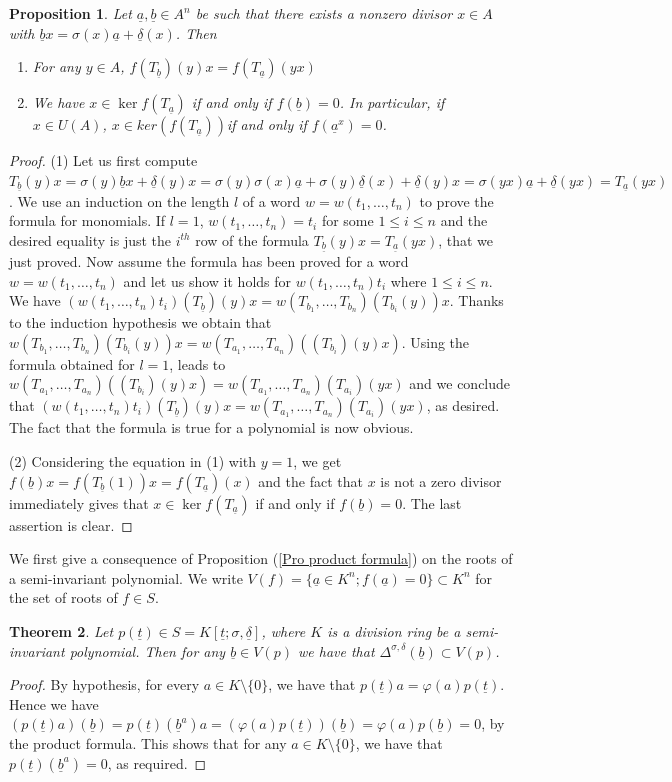 \documentclass[12pt,a4paper]{article}
\newtheorem{theorem}{Theorem}[section]
\newtheorem{proposition}[theorem]{Proposition}
\newcommand{\ut}{\underline{t}}
\newcommand{\ua}{\underline{a}}
\newcommand{\ub}{\underline{b}}
\newcommand{\ud}{\underline{\delta}}
\begin{document}
	\begin{proposition}
		\label{Pro Roots and conjugation}
		Let 
		$\ua,\ub\in A^n$  be such that there exists a nonzero divisor $x\in A$ with $\ub x= \sigma(x)\ua + \ud(x)$.  Then
		\begin{enumerate}
			\item For any $y\in A$, $f(T_{\ub})(y)x=f(T_{\ua})(yx)$
			\item We have 
			$x\in \ker f(T_{\ua}) $ if and only if $f(\ub)=0$.  In particular, if $x\in U(A)$, $x\in ker(f(T_{\ua}))$if and only if $f(\ua^x)=0$.
		\end{enumerate}
	\end{proposition}
	\begin{proof}
		(1)  Let us first compute 
		$T_{\ub}(y)x=\sigma(y)\ub x + 
		\ud(y)x=\sigma(y)\sigma(x)\ua 
		+\sigma(y)\ud(x)+\ud(y)x=\sigma(yx)\ua + \ud(yx)=T_{\ua}(yx)$.
		We use an induction on the length $l$ of a word $w=w(t_1,\dots , t_n)$ to prove the formula for monomials.  If $l=1$, $w(t_1,\dots,t_n)=t_i$ for some $1\le i \le n$ and the desired equality is just the $i^{th}$ row of the formula $T_{\ub}(y)x=T_{\ua}(yx)$, that we just proved.  Now assume the formula has been proved for a word $w=w(t_1,\dots,t_n)$ and let us show it holds for $w(t_1,\dots,t_n)t_i$ where $1\le i \le n$.  We have $(w(t_1,\dots,t_n)t_i)(T_{\ub})(y)x=
		w(T_{b_1},\dots ,T_{b_n})(T_{b_i}(y))x$.   Thanks to the induction hypothesis we obtain that 
		$w(T_{b_1},\dots ,T_{b_n})(T_{b_i}(y))x=w(T_{a_1},\dots,T_{a_n})((T_{b_i})(y)x)$.  Using the formula obtained for $l=1$,  leads to $w(T_{a_1},\dots,T_{a_n})((T_{b_i})(y)x)=
		w(T_{a_1},\dots,T_{a_n})(T_{a_i})(yx)$ and we conclude that $(w(t_1,\dots,t_n)t_i)(T_{\ub})(y)x=w(T_{a_1},\dots,T_{a_n})(T_{a_i})(yx)$, as desired. 
		The fact that the formula is true for a polynomial is now obvious.
		
		(2) Considering the equation in (1) with $y=1$, we get $f(\ub)x=f(T_{\ub}(1))x=f(T_{\ua})(x)$ and the fact that $x$ is not a zero divisor immediately gives that $x\in \ker f(T_{\ua})$ if and only if $f(\ub)=0$.  The last assertion is clear.
	\end{proof}
	
	We first give a consequence of Proposition (\ref{Pro product formula}) on the roots of a semi-invariant polynomial.   We write $ V(f) = \{\ua \in K^n ; f(\ua) = 0\} \subset K^n$ for the set of roots of $f\in S$.
	
	\begin{theorem} \label{Th Dring be semiinvar}
		Let $p(\ut)\in S=K[\ut; \sigma, \ud]$, where $K$ is a division ring be a semi-invariant polynomial.  Then for any $\ub\in V(p)$  we have that $\Delta^{\sigma,\delta}(\ub)\subset V(p)$.
	\end{theorem}
	\begin{proof}
		By hypothesis, for every 
		$a\in K\setminus\{0\}$, we have that $p(\ut) a=\varphi(a)p(\ut)$.  Hence we have 
		$(p(\ut)a)({\underline b})=p(\ut)({\underline b}^a)a=
		(\varphi(a)p(\ut))(\ub)= \varphi(a)p(\ub)=0$, by the product formula.  This shows that for any $a\in K\setminus\{0\}$, we have that
		$p(\ut)({\underline b}^a)=0$, as required. 
	\end{proof}
	
\end{document}
